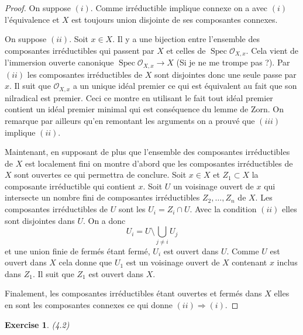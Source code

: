 \documentclass[A4, 11pt]{article}
\newtheorem{exer}{Exercise}
\def\Spec{ \operatorname{Spec}}
\begin{document}
\begin{proof}
On suppose $(i)$. Comme irréductible implique connexe on a avec $(i)$ l'équivalence et $X$ est toujours union disjointe de ses composantes connexes. 

On suppose $(ii)$. Soit $x\in X$. Il y a une bijection entre l'ensemble des composantes irréductibles qui passent par $X$ et celles de $\Spec \mathcal{O}_{X,x}$. Cela vient de l'immersion ouverte canonique $\Spec \mathcal{O}_{X,x} \rightarrow X$ (Si je ne me trompe pas ?). Par $(ii)$ les composantes irréductibles de $X$ sont disjointes donc une seule passe par $x$. Il suit que $\mathcal{O}_{X,x}$ a un unique idéal premier ce qui est équivalent au fait que son nilradical est premier. Ceci ce montre en utilisant le fait tout idéal premier contient un idéal premier minimal qui est conséquence du lemme de Zorn. On remarque par ailleurs qu'en remontant les arguments on a prouvé que $(iii)$ implique $(ii)$.

Maintenant, en supposant de plus que l'ensemble des composantes irréductibles de $X$ est localement fini on montre d'abord que les composantes irréductibles de $X$ sont ouvertes ce qui permettra de conclure. Soit $x\in X$ et $Z_1\subset X$ la composante irréductible qui contient $x$. Soit $U$ un voisinage ouvert de $x$ qui intersecte un nombre fini de composantes irréductibles $Z_2,\dots, Z_n$ de $X$. Les composantes irréductibles de $U$ sont les $U_i=Z_i\cap U$. Avec la condition $(ii)$ elles sont disjointes dans $U$. On a donc
$$U_i=U\setminus \bigcup\limits_{j\neq i} U_j$$
et une union finie de fermés étant fermé, $U_i$ est ouvert dans $U$. Comme $U$ est ouvert dans $X$ cela donne que $U_1$ est un voisinage ouvert de $X$ contenant $x$ inclus dans $Z_1$. Il suit que $Z_1$ est ouvert dans $X$. 

Finalement, les composantes irréductibles étant ouvertes et fermés dans $X$ elles en sont les composantes connexes ce qui donne $(ii)\Rightarrow (i)$. 
\end{proof}
\begin{exer} (4.2)
\end{exer}
\end{document}
